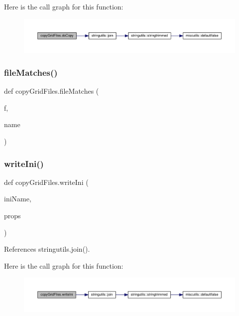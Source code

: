 Here is the call graph for this function\+:
\nopagebreak
\begin{figure}[H]
\begin{center}
\leavevmode
\includegraphics[width=350pt]{namespacecopyGridFiles_a2a1a9125be3fe46d8b1ae0f62f56c4c8_cgraph}
\end{center}
\end{figure}
\mbox{\label{namespacecopyGridFiles_a18b8cfd4665b3fdafe8c9bfdf21adbc9}} 
\subsubsection{\texorpdfstring{file\+Matches()}{fileMatches()}}
{\footnotesize\ttfamily def copy\+Grid\+Files.\+file\+Matches (\begin{DoxyParamCaption}\item[{}]{f,  }\item[{}]{name }\end{DoxyParamCaption})}

\mbox{\label{namespacecopyGridFiles_afd2344d5174f737237e0a7dde1e08248}} 
\subsubsection{\texorpdfstring{write\+Ini()}{writeIni()}}
{\footnotesize\ttfamily def copy\+Grid\+Files.\+write\+Ini (\begin{DoxyParamCaption}\item[{}]{ini\+Name,  }\item[{}]{props }\end{DoxyParamCaption})}



References stringutils.\+join().

Here is the call graph for this function\+:
\nopagebreak
\begin{figure}[H]
\begin{center}
\leavevmode
\includegraphics[width=350pt]{namespacecopyGridFiles_afd2344d5174f737237e0a7dde1e08248_cgraph}
\end{center}
\end{figure}


